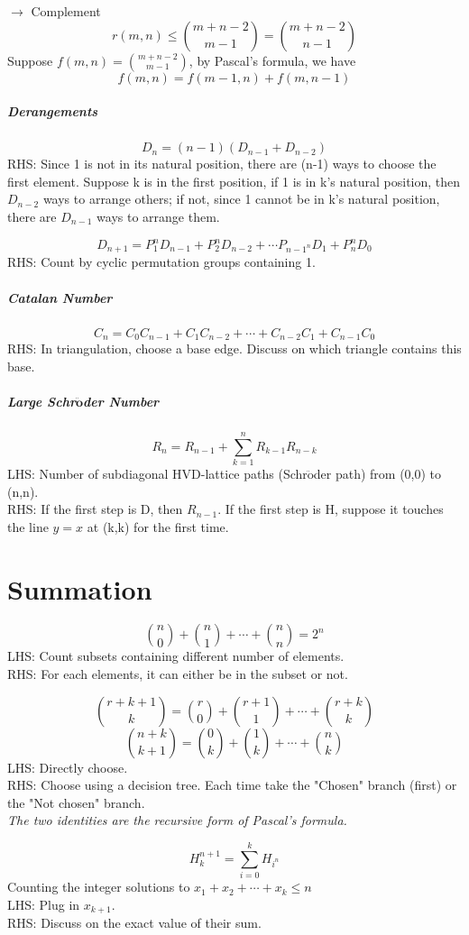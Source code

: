 \documentclass{article}
\begin{document}
	
	$ \rightarrow $ Complement\\
	$$r(m,n) \leq {m+n-2 \choose m-1} = {m+n-2 \choose n-1}$$
	Suppose $f(m,n) = {m+n-2 \choose m-1}$, by Pascal's formula, we have
	$$f(m,n)=f(m-1,n)+f(m,n-1) $$

	\subparagraph{Derangements}
	$$ D_n = (n-1)(D_{n-1} + D_{n-2})$$
	RHS: Since 1 is not in its natural position, there are (n-1) ways to choose the first element. Suppose k is in the first position, if 1 is in k's natural position, then $D_{n-2}$ ways to arrange others; if not, since 1 cannot be in k's natural position, there are $D_{n-1}$ ways to arrange them.

	$$ D_{n+1} = P_1^nD_{n-1}+P_2^nD_{n-2} + \cdots P_{n-1^n}D_1 + P_n^nD_0$$
	RHS: Count by cyclic permutation groups containing 1.

	\subparagraph{Catalan Number}
	$$ C_{n} = C_{0}C_{n-1} + C_{1}C_{n-2} + \cdots + C_{n-2}C_{1} + C_{n-1}C_0$$
	RHS: In triangulation, choose a base edge. Discuss on which triangle contains this base.

	\subparagraph{Large Schr$\mathbf{\ddot{o}}$der Number}
	$$ R_n = R_{n-1} + \sum_{k=1}^n R_{k-1} R_{n-k} $$
	LHS: Number of subdiagonal HVD-lattice paths (Schr$\mathrm{\ddot{o}}$der path) from (0,0) to (n,n).\\
	RHS: If the first step is D, then $R_{n-1}$. If the first step is H, suppose it touches the line $y=x$ at (k,k) for the first time.

	\section{Summation}
	$${n \choose 0} + {n \choose 1} + \cdots +{n \choose n} = 2^n$$
	LHS: Count subsets containing different number of elements.\\
	RHS: For each elements, it can either be in the subset or not.

	$${r+k+1 \choose k} = {r \choose 0} + {r+1 \choose 1} + \cdots + {r+k \choose k}$$
	$${n+k \choose k+1} = {0 \choose k} + {1 \choose k} + \cdots  + {n \choose k}$$
	LHS: Directly choose.\\
	RHS: Choose using a decision tree. Each time take the "Chosen" branch (first) or the "Not chosen" branch.\\
	\textit{The two identities are the recursive form of Pascal's formula.}

	$$H_{k}^{n+1} = \sum_{i=0}^{k} H_{i^n}$$
	Counting the integer solutions to $x_1 + x_2 + \cdots + x_k \leq n$\\
	LHS: Plug in $x_{k+1}$.\\
	RHS: Discuss on the exact value of their sum.
\end{document}
